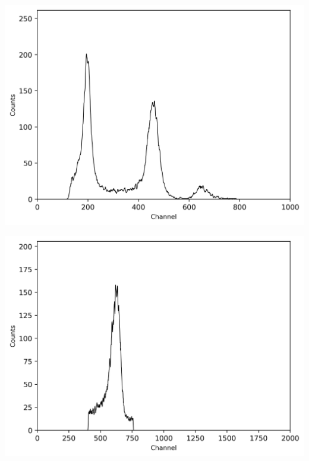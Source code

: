 \begin{center}
    \begin{adjustbox}{max width=\linewidth, keepaspectratio}
        \includegraphics[]{png/137CsmitTPHC_gated}
    \end{adjustbox}
    \label{fig:}
\end{center}
%
\begin{center}
    \begin{adjustbox}{max width=\linewidth, keepaspectratio}
        \includegraphics[]{png/137CsTPHC_geschnitten_neu}
    \end{adjustbox}
    \label{fig:}
\end{center}
